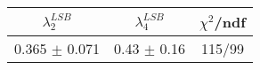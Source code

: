 \begin{tabular}{c|c||c}
$\lambda_{2}^{LSB}$ & $\lambda_4^{LSB}$ & $\chi^{2}$/ndf \\
\hline
0.365 $\pm$ 0.071 & 0.43 $\pm$ 0.16 & 115/99\\
\end{tabular}
